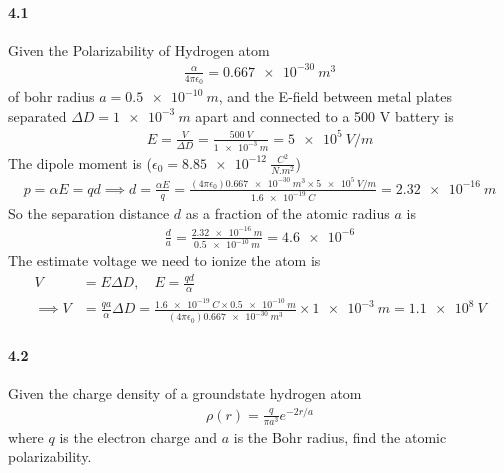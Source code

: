 \documentclass[../main.tex]{subfiles}
\begin{document}
\pagestyle{fancy}

\setcounter{section}{6}

\paragraph{4.1} 
Given the Polarizability of Hydrogen atom
\begin{align*}
    \frac{\alpha}{4\pi\epsilon_0} = \qty{0.667e-30}{m^3}
\end{align*}
of bohr radius $a = \qty{0.5e-10}{m}$,
and the E-field between metal plates separated $\Delta D = \qty{1e-3}{m}$ apart and connected to a 500 V battery is
\begin{align*}
    E = \frac{V}{\Delta D} = \frac{\qty{500}{V}}{\qty{1e-3}{m}} = \qty{5e5}{V/m}
\end{align*}
The dipole moment is ($\epsilon_0 = \qty{8.85e-12}{\frac{C^2}{N.m^2}}$)
\begin{align*}
    p = \alpha E = qd \implies d = \frac{\alpha E}{q} = \frac{(4\pi \epsilon_0) \qty{0.667e-30}{m^3} \times \qty{5e5}{V/m}}{\qty{1.6e-19}{C}} = \qty{2.32e-16}{m}
\end{align*}
So the separation distance $d$ as a fraction of the atomic radius $a$ is
\begin{align*}
    \boxed{
        \frac{d}{a} = \frac{\qty{2.32e-16}{m}}{\qty{0.5e-10}{m}} = \num{4.6e-6}
    }
\end{align*}
The estimate voltage we need to ionize the atom is 
\begin{align*}
    V &= E \Delta D, \quad E = \frac{qd}{\alpha} \\
    \implies V  &= \frac{qa}{\alpha} \Delta D = \frac{\qty{1.6e-19}{C} \times \qty{0.5e-10}{m}}{(4\pi \epsilon_0)\qty{0.667e-30}{m^3}} \times \qty{1e-3}{m} = \boxed{\qty{1.1e8}{V}}
\end{align*}

\newpage
\paragraph{4.2}
Given the charge density of a groundstate hydrogen atom
\begin{align*}
    \rho (r) = \frac{q}{\pi a^3} e^{-2r/a}
\end{align*}
where $q$ is the electron charge and $a$ is the Bohr radius, find the atomic polarizability. 
\end{document}
